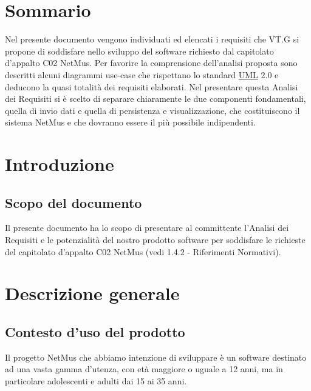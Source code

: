 \tableofcontents

\chapter*{Sommario}
Nel presente documento vengono individuati ed elencati i requisiti che VT.G si
propone di soddisfare nello sviluppo del software richiesto dal capitolato
d'appalto C02 NetMus. Per favorire la comprensione dell'analisi proposta sono
descritti alcuni diagrammi use-case che rispettano lo standard \underline{UML}
2.0 e deducono la quasi totalit\`a dei requisiti elaborati.
Nel presentare questa Analisi dei Requisiti si \`e scelto di separare
chiaramente le due componenti fondamentali, quella di invio dati e quella di persistenza e
visualizzazione, che costituiscono il sistema NetMus e che dovranno essere il
pi\`u possibile indipendenti.

\thispagestyle{fancy} %

\chapter{Introduzione}
\thispagestyle{fancy} %

\section{Scopo del documento}
Il presente documento ha lo scopo di presentare al committente l'Analisi dei
Requisiti e le potenzialit\`a del nostro prodotto software per soddisfare le
richieste del capitolato d'appalto C02 NetMus (vedi 1.4.2 - Riferimenti
Normativi).



\chapter{Descrizione generale}
\thispagestyle{fancy}

\section{Contesto d'uso del prodotto}
Il progetto NetMus che abbiamo intenzione di sviluppare \`e un software
destinato ad una vasta gamma d'utenza, con et\`a maggiore o uguale
a 12 anni, ma in particolare adolescenti e adulti dai 15 ai 35 anni.

